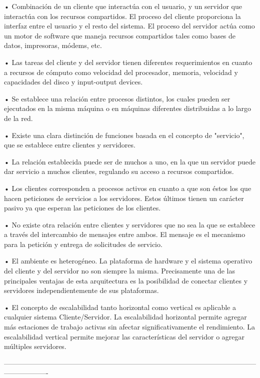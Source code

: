 • Combinación de un cliente que interactúa con el usuario, y un servidor que interactúa con los recursos compartidos. El 
proceso del cliente proporciona la interfaz entre el usuario y el resto del sistema. El proceso del servidor actúa como 
un motor de software que maneja recursos compartidos tales como bases de datos, impresoras, módems, etc.

• Las tareas del cliente y del servidor tienen diferentes requerimientos en cuanto a recursos de cómputo como velocidad 
del procesador, memoria, velocidad y capacidades del disco y input-output devices.

• Se establece una relación entre procesos distintos, los cuales pueden ser ejecutados en la misma máquina o en máquinas 
diferentes distribuidas a lo largo de la red.

• Existe una clara distinción de funciones basada en el concepto de "servicio", que se establece entre clientes y servidores.

• La relación establecida puede ser de muchos a uno, en la que un servidor puede dar servicio a muchos clientes, regulando 
su acceso a recursos compartidos.

• Los clientes corresponden a procesos activos en cuanto a que son éstos los que hacen peticiones de servicios a los
servidores.  Estos últimos tienen un carácter pasivo ya que esperan las peticiones de los clientes.

• No existe otra relación entre clientes y servidores que no sea la que se establece a través del intercambio de mensajes 
entre ambos. El mensaje es el mecanismo para la petición y entrega de solicitudes de servicio.

• El ambiente es heterogéneo. La plataforma de hardware y el sistema operativo del cliente y del servidor no son siempre 
la misma. Precisamente una de las principales ventajas de esta arquitectura es la posibilidad de conectar clientes y servidores 
independientemente de sus plataformas.

• El concepto de escalabilidad tanto horizontal como vertical es aplicable a cualquier sistema Cliente/Servidor. La escalabilidad 
horizontal permite agregar más estaciones de trabajo activas sin afectar significativamente el rendimiento. La escalabilidad 
vertical permite mejorar las características del servidor o agregar múltiples servidores.

-------------------------------------------------------------------------------------------------------------------------------

